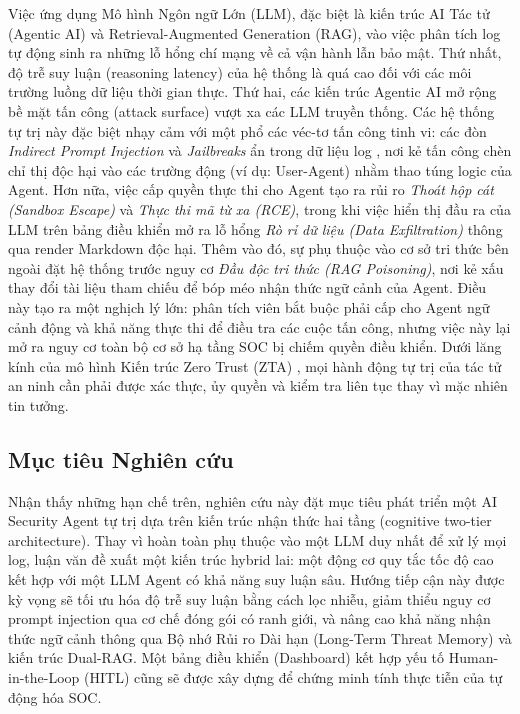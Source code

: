 \documentclass[12pt,a4paper]{article}
\begin{document}
Việc ứng dụng Mô hình Ngôn ngữ Lớn (LLM), đặc biệt là kiến trúc AI Tác tử (Agentic AI) và Retrieval-Augmented Generation (RAG), vào việc phân tích log tự động sinh ra những lỗ hổng chí mạng về cả vận hành lẫn bảo mật. Thứ nhất, độ trễ suy luận (reasoning latency) của hệ thống là quá cao đối với các môi trường luồng dữ liệu thời gian thực. Thứ hai, các kiến trúc Agentic AI mở rộng bề mặt tấn công (attack surface) vượt xa các LLM truyền thống. Các hệ thống tự trị này đặc biệt nhạy cảm với một phổ các véc-tơ tấn công tinh vi: các đòn \textit{Indirect Prompt Injection} và \textit{Jailbreaks} ẩn trong dữ liệu log \cite{greshake2023}, nơi kẻ tấn công chèn chỉ thị độc hại vào các trường động (ví dụ: User-Agent) nhằm thao túng logic của Agent. Hơn nữa, việc cấp quyền thực thi cho Agent tạo ra rủi ro \textit{Thoát hộp cát (Sandbox Escape)} và \textit{Thực thi mã từ xa (RCE)}, trong khi việc hiển thị đầu ra của LLM trên bảng điều khiển mở ra lỗ hổng \textit{Rò rỉ dữ liệu (Data Exfiltration)} thông qua render Markdown độc hại. Thêm vào đó, sự phụ thuộc vào cơ sở tri thức bên ngoài đặt hệ thống trước nguy cơ \textit{Đầu độc tri thức (RAG Poisoning)}, nơi kẻ xấu thay đổi tài liệu tham chiếu để bóp méo nhận thức ngữ cảnh của Agent. Điều này tạo ra một nghịch lý lớn: phân tích viên bắt buộc phải cấp cho Agent ngữ cảnh động và khả năng thực thi để điều tra các cuộc tấn công, nhưng việc này lại mở ra nguy cơ toàn bộ cơ sở hạ tầng SOC bị chiếm quyền điều khiển. Dưới lăng kính của mô hình Kiến trúc Zero Trust (ZTA) \cite{nist80207}, mọi hành động tự trị của tác tử an ninh cần phải được xác thực, ủy quyền và kiểm tra liên tục thay vì mặc nhiên tin tưởng.

\subsection{Mục tiêu Nghiên cứu}
Nhận thấy những hạn chế trên, nghiên cứu này đặt mục tiêu phát triển một AI Security Agent tự trị dựa trên kiến trúc nhận thức hai tầng (cognitive two-tier architecture). Thay vì hoàn toàn phụ thuộc vào một LLM duy nhất để xử lý mọi log, luận văn đề xuất một kiến trúc hybrid lai: một động cơ quy tắc tốc độ cao kết hợp với một LLM Agent có khả năng suy luận sâu. Hướng tiếp cận này được kỳ vọng sẽ tối ưu hóa độ trễ suy luận bằng cách lọc nhiễu, giảm thiểu nguy cơ prompt injection qua cơ chế đóng gói có ranh giới, và nâng cao khả năng nhận thức ngữ cảnh thông qua Bộ nhớ Rủi ro Dài hạn (Long-Term Threat Memory) và kiến trúc Dual-RAG. Một bảng điều khiển (Dashboard) kết hợp yếu tố Human-in-the-Loop (HITL) cũng sẽ được xây dựng để chứng minh tính thực tiễn của tự động hóa SOC.
\end{document}
